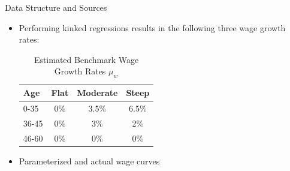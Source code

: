 \documentclass{beamer}
\begin{document}
\begin{frame}[allowframebreaks]{Data Structure and Sources}
\begin{itemize}
\framebreak

	\item Performing kinked regressions results in the following three wage growth rates:

\begin{table}
	\centering
	\caption{Estimated Benchmark Wage Growth Rates $\mu_w$}
	\begin{tabular}[c]{l|ccc}
		Age&Flat&Moderate&Steep\\
		\hline
		0-35&0\%&3.5\%&6.5\%\\
		36-45&0\%&3\%&2\%\\
		46-60&0\%&0\%&0\%\\
	\end{tabular}
\end{table}

\framebreak

	\item Parameterized and actual wage curves


\end{itemize}
\end{frame}
\end{document}
